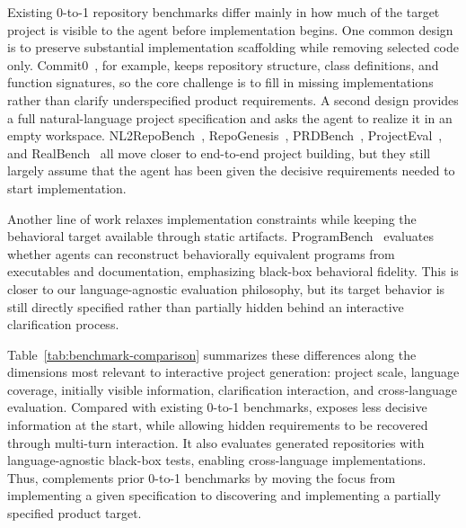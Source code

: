 Existing 0-to-1 repository benchmarks differ mainly in how much of the target project is visible to the agent before implementation begins. One common design is to preserve substantial implementation scaffolding while removing selected code only. Commit0~\cite{zhao2024commit0}, for example, keeps repository structure, class definitions, and function signatures, so the core challenge is to fill in missing implementations rather than clarify underspecified product requirements. A second design provides a full natural-language project specification and asks the agent to realize it in an empty workspace. NL2RepoBench~\cite{ding2026nl2repobench}, RepoGenesis~\cite{peng2026repogenesisbenchmarkingendtoendmicroservice}, PRDBench~\cite{fu2025prdbench}, ProjectEval~\cite{liu2025projecteval}, and RealBench~\cite{li2026realbench} all move closer to end-to-end project building, but they still largely assume that the agent has been given the decisive requirements needed to start implementation.

Another line of work relaxes implementation constraints while keeping the behavioral target available through static artifacts. ProgramBench~\cite{yang2026programbench} evaluates whether agents can reconstruct behaviorally equivalent programs from executables and documentation, emphasizing black-box behavioral fidelity. This is closer to our language-agnostic evaluation philosophy, but its target behavior is still directly specified rather than partially hidden behind an interactive clarification process.

Table~\ref{tab:benchmark-comparison} summarizes these differences along the dimensions most relevant to interactive project generation: project scale, language coverage, initially visible information, clarification interaction, and cross-language evaluation. Compared with existing 0-to-1 benchmarks, \rcb{} exposes less decisive information at the start, while allowing hidden requirements to be recovered through multi-turn interaction. It also evaluates generated repositories with language-agnostic black-box tests, enabling cross-language implementations. Thus, \rcb{} complements prior 0-to-1 benchmarks by moving the focus from implementing a given specification to discovering and implementing a partially specified product target.


